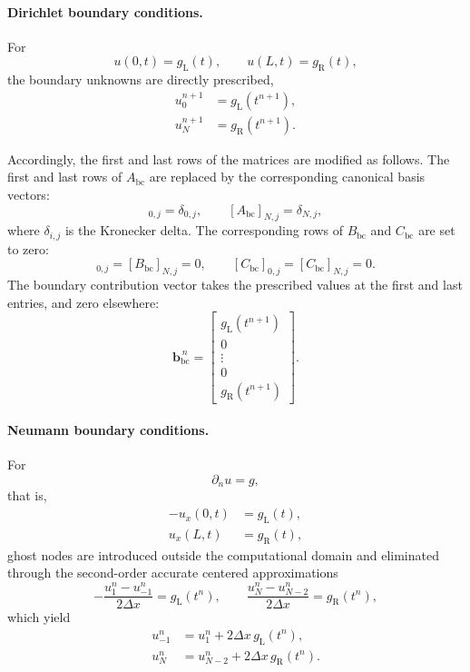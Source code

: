 \documentclass{Configuration_Files/PoliMi3i_thesis}
\begin{document}
\paragraph{Dirichlet boundary conditions.}

For
\begin{equation*}
u(0,t)=g_{\mathrm L}(t),
\qquad
u(L,t)=g_{\mathrm R}(t),
\end{equation*}
the boundary unknowns are directly prescribed,
\begin{align*}
u_0^{n+1}&=g_{\mathrm L}(t^{n+1}),
\\
u_{N}^{n+1}&=g_{\mathrm R}(t^{n+1}).
\end{align*}

Accordingly, the first and last rows of the matrices are modified as follows. The first and last rows of $A_{\mathrm{bc}}$ are replaced by the corresponding canonical basis vectors:
\begin{equation*}
[A_{\mathrm{bc}}]_{0,j} = \delta_{0,j}, \qquad [A_{\mathrm{bc}}]_{N,j} = \delta_{N,j},
\end{equation*}
where $\delta_{i,j}$ is the Kronecker delta. The corresponding rows of $B_{\mathrm{bc}}$ and $C_{\mathrm{bc}}$ are set to zero:
\begin{equation*}
[B_{\mathrm{bc}}]_{0,j} = [B_{\mathrm{bc}}]_{N,j} = 0, \qquad [C_{\mathrm{bc}}]_{0,j} = [C_{\mathrm{bc}}]_{N,j} = 0.
\end{equation*}
The boundary contribution vector takes the prescribed values at the first and last entries, and zero elsewhere:
\begin{equation*}
\mathbf{b}_{\mathrm{bc}}^{\,n}
=
\begin{bmatrix}
g_{\mathrm L}(t^{n+1}) \\
0 \\
\vdots \\
0 \\
g_{\mathrm R}(t^{n+1})
\end{bmatrix}.
\end{equation*}

\paragraph{Neumann boundary conditions.}

For
\begin{equation*}
\partial_n u=g,
\end{equation*}
that is,
\begin{align*}
-u_x(0,t)&=g_{\mathrm L}(t),
\\
u_x(L,t)&=g_{\mathrm R}(t),
\end{align*}
ghost nodes are introduced outside the computational domain and eliminated through the second-order accurate centered approximations
\begin{equation*}
-\frac{u_{1}^n-u_{-1}^n}{2\Delta x}
=
g_{\mathrm L}(t^n),
\qquad
\frac{u_N^n-u_{N-2}^n}{2\Delta x}
=
g_{\mathrm R}(t^n),
\end{equation*}
which yield
\begin{align*}
u_{-1}^n
&=
u_1^n
+
2\Delta x\,g_{\mathrm L}(t^n),
\\
u_N^n
&=
u_{N-2}^n
+
2\Delta x\,g_{\mathrm R}(t^n).
\end{align*}
\end{document}
